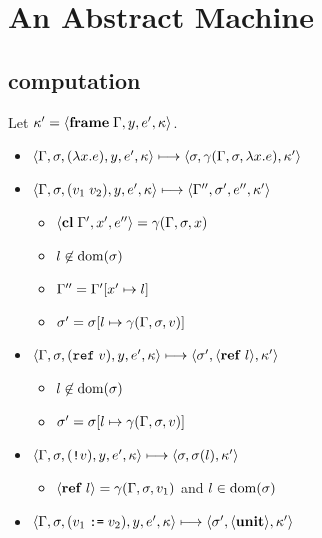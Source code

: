 \documentclass{article}
\begin{document}
\section{An Abstract Machine}
\begin{minipage}{\textwidth}
\begin{minipage}[t]{0.50\textwidth}

\subsection{computation}
Let $\kappa' = \langle\mathbf{frame}\; \Gamma,y,e',\kappa\rangle$.
\begin{itemize}
\item $\langle\Gamma,\sigma,(\lambda x.e),y,e',\kappa\rangle \longmapsto \langle \sigma,\gamma(\Gamma,\sigma,\lambda x.e), \kappa'\rangle$
\item $\langle\Gamma,\sigma,(v_1\;v_2),y,e',\kappa\rangle \longmapsto \langle\Gamma'',\sigma',e'',\kappa'\rangle$

\begin{itemize}
\item $\langle\mathbf{cl}\; \Gamma',x',e''\rangle=\gamma(\Gamma,\sigma,x)$
\item $l\not\in\operatorname{dom}(\sigma)$
\item $\Gamma''=\Gamma'[x'\mapsto l]$
\item $\sigma'=\sigma[l\mapsto \gamma(\Gamma,\sigma,v)]$
\end{itemize}

\item $\langle\Gamma,\sigma,(\mathtt{ref}\; v),y,e',\kappa\rangle \longmapsto \langle\sigma', \langle\mathbf{ref}\; l\rangle,\kappa'\rangle$

\begin{itemize}
  \item $l\not\in\operatorname{dom}(\sigma)$
  \item $\sigma'=\sigma[l\mapsto \gamma(\Gamma,\sigma,v)]$
\end{itemize}

\item $\langle\Gamma,\sigma,(\text{\texttt{!}}v),y,e',\kappa\rangle \longmapsto \langle\sigma, \sigma(l),\kappa'\rangle$

\begin{itemize}
\item $\langle\mathbf{ref}\; l\rangle=\gamma(\Gamma,\sigma,v_1)$ and $l\in\operatorname{dom}(\sigma)$
\end{itemize}

\item $\langle\Gamma,\sigma,(v_1\; \text{\texttt{:=}}\; v_2),y,e',\kappa\rangle \longmapsto \langle\sigma',\langle\mathbf{unit}\rangle,\kappa'\rangle$


\end{itemize}
\end{minipage}
\end{minipage}
\end{document}
